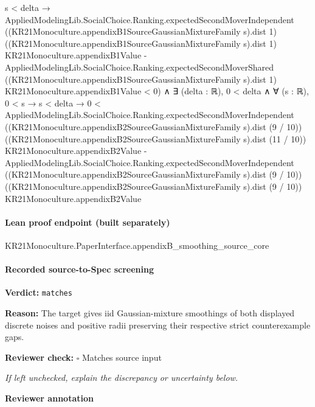 \documentclass[10pt]{article}
\newcommand{\reviewerbox}{%
  \par\noindent\fbox{\parbox{0.96\linewidth}{\rule{0pt}{0.38in}}}\par
}
\newcommand{\reviewmatch}[1]{%
  \par\noindent\textbf{Reviewer check:} $\square$\; #1\par
  \noindent\emph{If left unchecked, explain the discrepancy or uncertainty below.}\par
}
\begin{document}
\begin{ReviewVerbatim}
                              s < delta →
                                AppliedModelingLib.SocialChoice.Ranking.expectedSecondMoverIndependent
                                      ((KR21Monoculture.appendixB1SourceGaussianMixtureFamily s).dist 1)
                                      ((KR21Monoculture.appendixB1SourceGaussianMixtureFamily s).dist 1)
                                      KR21Monoculture.appendixB1Value -
                                    AppliedModelingLib.SocialChoice.Ranking.expectedSecondMoverShared
                                      ((KR21Monoculture.appendixB1SourceGaussianMixtureFamily s).dist 1)
                                      KR21Monoculture.appendixB1Value <
                                  0) ∧
                      ∃ (delta : ℝ),
                        0 < delta ∧
                          ∀ (s : ℝ),
                            0 < s →
                              s < delta →
                                0 <
                                  AppliedModelingLib.SocialChoice.Ranking.expectedSecondMoverIndependent
                                      ((KR21Monoculture.appendixB2SourceGaussianMixtureFamily s).dist (9 / 10))
                                      ((KR21Monoculture.appendixB2SourceGaussianMixtureFamily s).dist (11 / 10))
                                      KR21Monoculture.appendixB2Value -
                                    AppliedModelingLib.SocialChoice.Ranking.expectedSecondMoverIndependent
                                      ((KR21Monoculture.appendixB2SourceGaussianMixtureFamily s).dist (9 / 10))
                                      ((KR21Monoculture.appendixB2SourceGaussianMixtureFamily s).dist (9 / 10))
                                      KR21Monoculture.appendixB2Value
\end{ReviewVerbatim}

\paragraph{Lean proof endpoint (built separately)}\begin{ReviewVerbatim}
KR21Monoculture.PaperInterface.appendixB_smoothing_source_core
\end{ReviewVerbatim}

\paragraph{Recorded source-to-Spec screening}
\textbf{Verdict:} \texttt{matches}
\\
{\raggedright
\textbf{Reason:} The target gives iid Gaussian-\allowbreak{}mixture smoothings of both displayed discrete noises and positive radii preserving their respective strict counterexample gaps.\allowbreak{}
\par}
\reviewmatch{Matches source input}
\noindent\textbf{Reviewer annotation}\par
\reviewerbox
\end{document}
